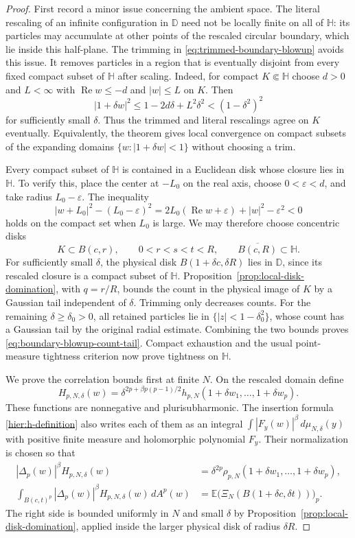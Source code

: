 \documentclass[11pt,a4paper]{article}
\numberwithin{equation}{section}
\theoremstyle{definition}
\theoremstyle{remark}
\newcommand{\D}{\mathbb D}
\newcommand{\E}{\mathbb E}
\begin{document}
\begin{proof}
First record a minor issue concerning the ambient space. The literal
rescaling of an infinite configuration in $\D$ need not be locally
finite on all of $\mathbb H$: its particles may accumulate at other
points of the rescaled circular boundary, which lie inside this
half-plane. The trimming in \eqref{eq:trimmed-boundary-blowup} avoids
this issue. It removes particles in a region that is eventually
disjoint from every fixed compact subset of $\mathbb H$ after scaling.
Indeed, for compact $K\Subset\mathbb H$ choose $d>0$ and $L<\infty$
with $\operatorname{Re}w\le-d$ and $|w|\le L$ on $K$. Then
\[
 |1+\delta w|^2\le1-2d\delta+L^2\delta^2
                   <(1-\delta^2)^2
\]
for sufficiently small $\delta$. Thus the trimmed and literal
rescalings agree on $K$ eventually. Equivalently, the theorem gives
local convergence on compact subsets of the expanding domains
$\{w:|1+\delta w|<1\}$ without choosing a trim.

Every compact subset of $\mathbb H$ is contained in a Euclidean disk
whose closure lies in $\mathbb H$. To verify this, place the center at
$-L_0$ on the real axis, choose $0<\varepsilon<d$, and take radius
$L_0-\varepsilon$. The inequality
\[
 |w+L_0|^2-(L_0-\varepsilon)^2
 =2L_0(\operatorname{Re}w+\varepsilon)+|w|^2-\varepsilon^2<0
\]
holds on the compact set when $L_0$ is large. We may therefore choose
concentric disks
\[
 K\subset B(c,r),\qquad
 0<r<s<t<R,\qquad \overline{B(c,R)}\subset\mathbb H.
\]
For sufficiently small $\delta$, the physical disk
$B(1+\delta c,\delta R)$ lies in $\D$, since its rescaled closure is a
compact subset of $\mathbb H$. Proposition~\ref{prop:local-disk-domination},
with $q=r/R$, bounds the count in the physical image of $K$ by a
Gaussian tail independent of $\delta$. Trimming only decreases counts.
For the remaining $\delta\ge\delta_0>0$, all retained particles lie
in $\{|z|<1-\delta_0^2\}$, whose count has a Gaussian tail by the
original radial estimate. Combining the two bounds proves
\eqref{eq:boundary-blowup-count-tail}. Compact exhaustion and the usual
point-measure tightness criterion now prove tightness on $\mathbb H$.

We prove the correlation bounds first at finite $N$. On the rescaled
domain define
\[
 H_{p,N,\delta}(w)
 =\delta^{2p+\beta p(p-1)/2}
       h_{p,N}(1+\delta w_1,\ldots,1+\delta w_p).
\]
These functions are nonnegative and plurisubharmonic. The insertion
formula \eqref{hier:h-definition} also writes each of them as
an integral $\int|F_y(w)|^\beta\,d\mu_{N,\delta}(y)$ with positive
finite measure and holomorphic polynomial $F_y$. Their normalization
is chosen so that
\begin{align*}
 |\Delta_p(w)|^\beta H_{p,N,\delta}(w)
 &=\delta^{2p}\rho_{p,N}(1+\delta w_1,\ldots,1+\delta w_p),\\
 \int_{B(c,t)^p}|\Delta_p(w)|^\beta H_{p,N,\delta}(w)\,dA^p(w)
 &=\E\bigl(\Xi_N(B(1+\delta c,\delta t))\bigr)_p.
\end{align*}
The right side is bounded uniformly in $N$ and small $\delta$ by
Proposition~\ref{prop:local-disk-domination}, applied inside the larger
physical disk of radius $\delta R$.


\end{proof}
\end{document}
